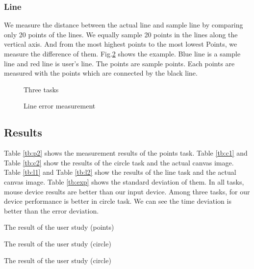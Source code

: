 \subsubsection{Line}
We measure the distance between the actual line and sample line by comparing only 20 points of the lines. We equally sample 20 points in the lines along the vertical axis. And from the most highest points to the most lowest Points, we measure the difference of them.
Fig.\ref{linem} shows the example. Blue line is a sample line and red line is user's line. The points are sample points. Each points are measured with the points which are connected by the black line.
\begin{figure}

 \caption{Three tasks}
 \label{task}
\end{figure}

\begin{figure}[htbp]
 \centering
 
 \caption{Line error measurement}
 \label{linem}
\end{figure}


\subsection{Results}
Table \ref{tb:p2} shows the measurement results of the points task. Table \ref{tb:c1} and Table \ref{tb:c2} show the results of the circle task and the actual canvas image. Table \ref{tb:l1} and Table \ref{tb:l2} show the results of the line task and the actual canvas image. Table \ref{tb:exp} shows the standard deviation of them. In all tasks, mouse device results are better than our input device. Among three tasks, for our device performance is better in circle task. We can see the time deviation is better than the error deviation.

\begin{table}[htbp]
 \centering
 \caption{The result of the user study (points)}
 \label{tb:p2}
 
\end{table}


\begin{table}[htbp]
 \centering
 \caption{The result of the user study (circle)}
 \label{tb:c1}
 
\end{table}



\begin{table}[htbp]
 \centering
 \caption{The result of the user study (circle)}
 \label{tb:c2}
 
\end{table}


